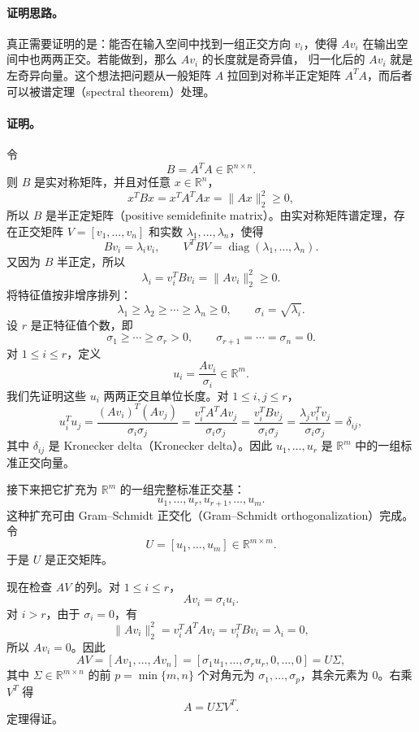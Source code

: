 \paragraph{证明思路。}
真正需要证明的是：能否在输入空间中找到一组正交方向
$v_i$，使得 $Av_i$ 在输出空间中也两两正交。若能做到，那么 $Av_i$ 的长度就是奇异值，
归一化后的 $Av_i$ 就是左奇异向量。这个想法把问题从一般矩阵 $A$ 拉回到对称半正定矩阵
$A^TA$，而后者可以被谱定理（spectral theorem）处理。

\paragraph{证明。}
令
\[
    B=A^TA\in\mathbb{R}^{n\times n}.
\]
则 $B$ 是实对称矩阵，并且对任意 $x\in\mathbb{R}^n$，
\[
    x^TBx=x^TA^TAx=\|Ax\|_2^2\ge 0,
\]
所以 $B$ 是半正定矩阵（positive semidefinite matrix）。由实对称矩阵谱定理，存在正交矩阵
$V=[v_1,\ldots,v_n]$ 和实数 $\lambda_1,\ldots,\lambda_n$，使得
\[
    Bv_i=\lambda_i v_i,\qquad
    V^TBV=\operatorname{diag}(\lambda_1,\ldots,\lambda_n).
\]
又因为 $B$ 半正定，所以
\[
    \lambda_i = v_i^TBv_i=\|Av_i\|_2^2\ge 0.
\]
将特征值按非增序排列：
\[
    \lambda_1\ge\lambda_2\ge\cdots\ge\lambda_n\ge0,
    \qquad
    \sigma_i=\sqrt{\lambda_i}.
\]
设 $r$ 是正特征值个数，即
\[
    \sigma_1\ge\cdots\ge\sigma_r>0,
    \qquad
    \sigma_{r+1}=\cdots=\sigma_n=0.
\]
对 $1\le i\le r$，定义
\[
    u_i=\frac{Av_i}{\sigma_i}\in\mathbb{R}^m.
\]
我们先证明这些 $u_i$ 两两正交且单位长度。对 $1\le i,j\le r$，
\[
    u_i^Tu_j
    =
    \frac{(Av_i)^T(Av_j)}{\sigma_i\sigma_j}
    =
    \frac{v_i^TA^TAv_j}{\sigma_i\sigma_j}
    =
    \frac{v_i^TBv_j}{\sigma_i\sigma_j}
    =
    \frac{\lambda_j v_i^Tv_j}{\sigma_i\sigma_j}
    =
    \delta_{ij},
\]
其中 $\delta_{ij}$ 是 Kronecker delta（Kronecker delta）。因此
$u_1,\ldots,u_r$ 是 $\mathbb{R}^m$ 中的一组标准正交向量。

接下来把它扩充为 $\mathbb{R}^m$ 的一组完整标准正交基：
\[
    u_1,\ldots,u_r,u_{r+1},\ldots,u_m.
\]
这种扩充可由 Gram--Schmidt 正交化（Gram--Schmidt orthogonalization）完成。令
\[
    U=[u_1,\ldots,u_m]\in\mathbb{R}^{m\times m}.
\]
于是 $U$ 是正交矩阵。

现在检查 $AV$ 的列。对 $1\le i\le r$，
\[
    Av_i=\sigma_i u_i.
\]
对 $i>r$，由于 $\sigma_i=0$，有
\[
    \|Av_i\|_2^2=v_i^TA^TAv_i=v_i^TBv_i=\lambda_i=0,
\]
所以 $Av_i=0$。因此
\[
    AV
        =
        [Av_1,\ldots,Av_n]
    =
    [\sigma_1u_1,\ldots,\sigma_ru_r,0,\ldots,0]
    =
    U\Sigma,
\]
其中 $\Sigma\in\mathbb{R}^{m\times n}$ 的前 $p=\min\{m,n\}$ 个对角元为
$\sigma_1,\ldots,\sigma_p$，其余元素为 $0$。右乘 $V^T$ 得
\[
    A=U\Sigma V^T.
\]
定理得证。

